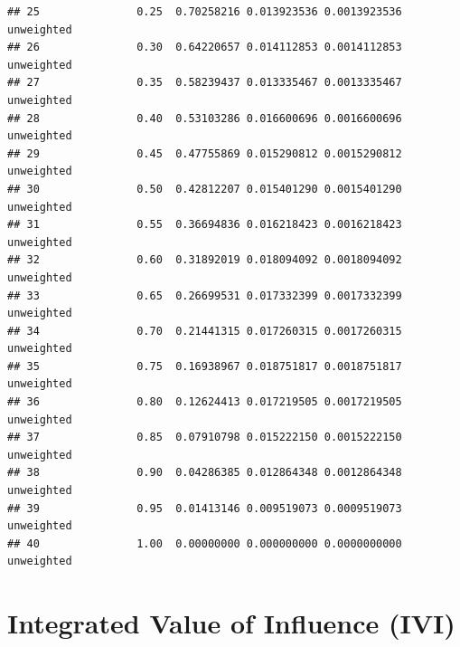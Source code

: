 \documentclass[
]{book}
\begin{document}
\begin{verbatim}
## 25               0.25  0.70258216 0.013923536 0.0013923536 unweighted
## 26               0.30  0.64220657 0.014112853 0.0014112853 unweighted
## 27               0.35  0.58239437 0.013335467 0.0013335467 unweighted
## 28               0.40  0.53103286 0.016600696 0.0016600696 unweighted
## 29               0.45  0.47755869 0.015290812 0.0015290812 unweighted
## 30               0.50  0.42812207 0.015401290 0.0015401290 unweighted
## 31               0.55  0.36694836 0.016218423 0.0016218423 unweighted
## 32               0.60  0.31892019 0.018094092 0.0018094092 unweighted
## 33               0.65  0.26699531 0.017332399 0.0017332399 unweighted
## 34               0.70  0.21441315 0.017260315 0.0017260315 unweighted
## 35               0.75  0.16938967 0.018751817 0.0018751817 unweighted
## 36               0.80  0.12624413 0.017219505 0.0017219505 unweighted
## 37               0.85  0.07910798 0.015222150 0.0015222150 unweighted
## 38               0.90  0.04286385 0.012864348 0.0012864348 unweighted
## 39               0.95  0.01413146 0.009519073 0.0009519073 unweighted
## 40               1.00  0.00000000 0.000000000 0.0000000000 unweighted
\end{verbatim}

\section{Integrated Value of Influence (IVI)}\label{integrated-value-of-influence-ivi}
\end{document}

